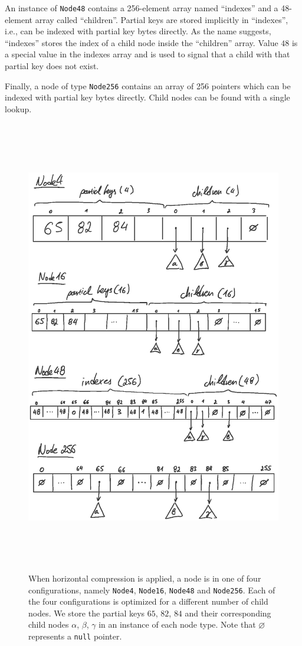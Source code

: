 \documentclass[abstracton,12pt]{scrartcl}
\theoremstyle{definition}
\begin{document}
An instance of \texttt{Node48} contains a 256-element array named 
``indexes'' and a 48-element array called ``children''.
Partial keys are stored implicitly in ``indexes'', i.e., 
can be indexed with partial key bytes directly.
As the name suggests, ``indexes'' stores the index of a child
node inside the ``children'' array. Value $48$ is a special value in the
indexes array and is used to signal that a child with that partial key
does not exist.

Finally, a node of type \texttt{Node256} contains an array of
256 pointers which can be indexed with partial key bytes directly.
Child nodes can be found with a single lookup.

\begin{figure}[H]
  \centering
  \includegraphics[height=20cm,trim={2.5cm 5cm 2.5cm 3.5cm},clip]{art_nodes_draw}
  \caption{
    When horizontal compression is applied, a node is in one of four 
    configurations, namely \texttt{Node4}, \texttt{Node16}, \texttt{Node48} 
    and \texttt{Node256}.
    Each of the four configurations is optimized for a different number of 
    child nodes. We store the partial keys $65$, $82$, $84$ and their 
    corresponding child nodes $\alpha$, $\beta$, $\gamma$ in an instance
    of each node type. Note that $\varnothing$ represents a \texttt{null} 
    pointer.
  }
 \label{fig:horizontal-compression}
\end{figure}
\end{document}
